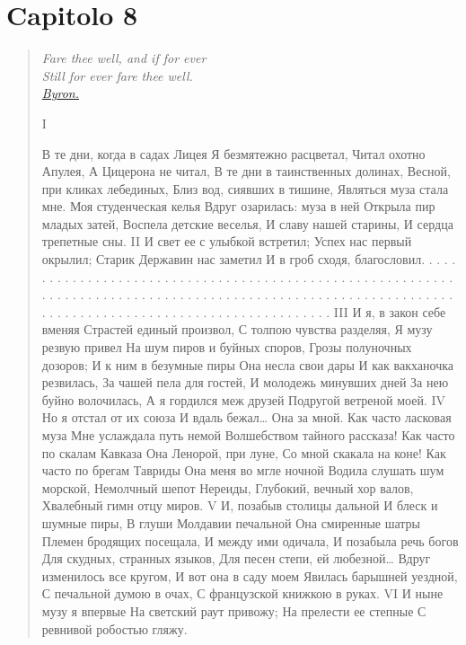 \chapter{Capitolo 8}\label{section:cap8}%

\begin{verse}

\textit{Fare thee well, and if for ever\\
Still for ever fare thee well.\\
\hyperref[sec:faretheewell]{Byron.}}

I

В те дни, когда в садах Лицея
Я безмятежно расцветал,
Читал охотно Апулея,
А Цицерона не читал,
В те дни в таинственных долинах,
Весной, при кликах лебединых,
Близ вод, сиявших в тишине,
Являться муза стала мне.
Моя студенческая келья
Вдруг озарилась: муза в ней
Открыла пир младых затей,
Воспела детские веселья,
И славу нашей старины,
И сердца трепетные сны.
II
И свет ее с улыбкой встретил;
Успех нас первый окрылил;
Старик Державин нас заметил
И в гроб сходя, благословил.
. . . . . . . . . . . . . . .
. . . . . . . . . . . . . . .
. . . . . . . . . . . . . . .
. . . . . . . . . . . . . . .
. . . . . . . . . . . . . . .
. . . . . . . . . . . . . . .
. . . . . . . . . . . . . . .
. . . . . . . . . . . . . . .
. . . . . . . . . . . . . . .
. . . . . . . . . . . . . . .
III
И я, в закон себе вменяя
Страстей единый произвол,
С толпою чувства разделяя,
Я музу резвую привел
На шум пиров и буйных споров,
Грозы полуночных дозоров;
И к ним в безумные пиры
Она несла свои дары
И как вакханочка резвилась,
За чашей пела для гостей,
И молодежь минувших дней
За нею буйно волочилась,
А я гордился меж друзей
Подругой ветреной моей.
IV
Но я отстал от их союза
И вдаль бежал… Она за мной.
Как часто ласковая муза
Мне услаждала путь немой
Волшебством тайного рассказа!
Как часто по скалам Кавказа
Она Ленорой, при луне,
Со мной скакала на коне!
Как часто по брегам Тавриды
Она меня во мгле ночной
Водила слушать шум морской,
Немолчный шепот Нереиды,
Глубокий, вечный хор валов,
Хвалебный гимн отцу миров.
V
И, позабыв столицы дальной
И блеск и шумные пиры,
В глуши Молдавии печальной
Она смиренные шатры
Племен бродящих посещала,
И между ими одичала,
И позабыла речь богов
Для скудных, странных языков,
Для песен степи, ей любезной…
Вдруг изменилось все кругом,
И вот она в саду моем
Явилась барышней уездной,
С печальной думою в очах,
С французской книжкою в руках.
VI
И ныне музу я впервые
На светский раут привожу;
На прелести ее степные
С ревнивой робостью гляжу.

\end{verse}
